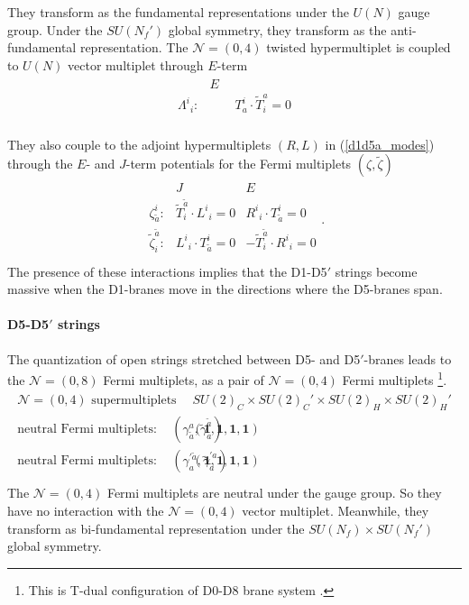 \documentclass{article}
\numberwithin{equation}{section}
\begin{document}
They transform as the fundamental representations under the $U(N)$ gauge group. 
Under the $SU(N_{f}')$ global symmetry, 
they transform as the anti-fundamental representation. 
The $\mathcal{N}=(0,4)$ twisted hypermultiplet is coupled to $U(N)$ vector multiplet through 
$E$-term 
\begin{align}
\label{e_d1d5'}
\begin{array}{cc}
&E\\
{\Lambda^{i}}_{i}:& \qquad T^{i}_{a}\cdot \widetilde{T}_{i}^{a}=0\\
\end{array}
\end{align}


They also couple to the adjoint hypermultiplets $(R,L)$ in (\ref{d1d5a_modes}) 
through the $E$- and $J$-term potentials for 
the Fermi multiplets $(\zeta, \widetilde{\zeta})$
\begin{align}
\label{je_d1d5'}
\begin{array}{lcc}
&J&E \\
\zeta^{i}_{\tilde{a}}:&
\widetilde{T}_{i}^{\tilde{a}}\cdot {L^{i}}_{i}=0&
{R^{i}}_{i}\cdot T^{i}_{\tilde{a}}=0\\
\widetilde{\zeta}_{i}^{\tilde{a}}:&
{L^{i}}_{i}\cdot T^{i}_{\tilde{a}}=0&
-\widetilde{T}_{i}^{\tilde{a}}\cdot {R^{i}}_{i}=0\\
\end{array}. 
\end{align}
The presence of these interactions implies that 
the D1-D5$'$ strings become massive 
when the D1-branes move in the directions where the D5-branes span. 








\paragraph{D5-D5$'$ strings}
The quantization of open strings stretched between D5- and D5$'$-branes leads to 
the $\mathcal{N}=(0,8)$ Fermi multiplets, as a pair of $\mathcal{N}=(0,4)$ Fermi multiplets 
\footnote{This is T-dual configuration of D0-D8 brane system \cite{Banks:1997zs, Bachas:1997kn}.}.
\begin{align}
\label{d5d5_modes}
\begin{array}{c|c}
\textrm{$\mathcal{N}=(0,4)$ supermultiplets}& SU(2)_{C}\times SU(2)_{C}'\times SU(2)_{H}\times SU(2)_{H}' \\ \hline 
\textrm{neutral Fermi multiplets}:\quad (\gamma^{a}_{\tilde{a}}, 
\widetilde{\gamma}_{a}^{\tilde{a}})&(\bm{1}, \bm{1},\bm{1},\bm{1}) \\
\textrm{neutral Fermi multiplets}:\quad (\gamma_{a}^{'\tilde{a}}, 
\widetilde{\gamma}^{'a}_{\tilde{a}})&(\bm{1}, \bm{1},\bm{1},\bm{1}) \\
\end{array}
\end{align}
The $\mathcal{N}=(0,4)$ Fermi multiplets are neutral under the gauge group. 
So they have no interaction with the $\mathcal{N}=(0,4)$ vector multiplet. 
Meanwhile, they transform as bi-fundamental representation under the $SU(N_{f})\times SU(N_{f}')$ global symmetry. 
\end{document}
